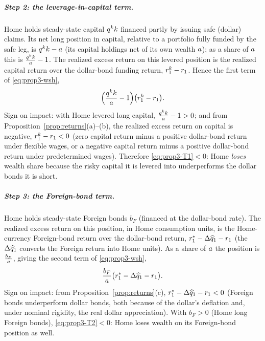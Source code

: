 \subparagraph{Step 2: the leverage-in-capital term.} Home holds steady-state
capital $q^{k} k$ financed partly by issuing safe (dollar) claims. Its net long
position in capital, relative to a portfolio fully funded by the safe leg, is
$q^{k} k-a$ (its capital holdings net of its own wealth $a$); as a share of
$a$ this is $\frac{q^{k} k}{a}-1$. The realized excess return on this levered
position is the realized capital return over the dollar-bond funding return,
$r^{k}_1-r_1$. Hence the first term of \eqref{eq:prop3-wsh},
\begin{equation}
\Bigl(\frac{q^{k} k}{a}-1\Bigr)\bigl(r^{k}_1-r_1\bigr). \label{eq:prop3-T1}
\end{equation}
Sign on impact: with Home levered long capital, $\frac{q^{k} k}{a}-1>0$; and from
Proposition~\ref{prop:returns}(a)--(b), the realized excess return on capital is
negative, $r^{k}_1-r_1<0$ (zero capital return minus a positive dollar-bond
return under flexible wages, or a negative capital return minus a positive
dollar-bond return under predetermined wages). Therefore
\eqref{eq:prop3-T1}$<0$: Home \emph{loses} wealth share because the risky capital
it is levered into underperforms the dollar bonds it is short.

\subparagraph{Step 3: the Foreign-bond term.} Home holds steady-state Foreign
bonds $b_F$ (financed at the dollar-bond rate). The realized excess return on this
position, in Home consumption units, is the Home-currency Foreign-bond return over
the dollar-bond return, $r^{*}_1-\Delta\widehat{q}_1-r_1$ (the $\Delta\widehat{q}_1$
converts the Foreign return into Home units). As a share of $a$ the position is
$\frac{b_F}{a}$, giving the second term of \eqref{eq:prop3-wsh},
\begin{equation}
\frac{b_F}{a}\bigl(r^{*}_1-\Delta\widehat{q}_1-r_1\bigr). \label{eq:prop3-T2}
\end{equation}
Sign on impact: from Proposition~\ref{prop:returns}(c),
$r^{*}_1-\Delta\widehat{q}_1-r_1<0$ (Foreign bonds underperform dollar bonds, both
because of the dollar's deflation and, under nominal rigidity, the real dollar
appreciation). With $b_F>0$ (Home long Foreign bonds), \eqref{eq:prop3-T2}$<0$:
Home loses wealth on its Foreign-bond position as well.

